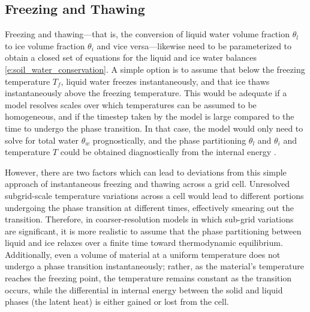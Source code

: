 \documentclass[twoside,10pt]{report}
\begin{document}
\subsection{Freezing and Thawing}
Freezing and thawing---that is, the conversion of liquid water volume fraction $\theta_l$ to ice volume fraction $\theta_i$ and vice versa---likewise need to be parameterized to obtain a closed set of equations for the liquid and ice water balances \eqref{e:soil_water_conservation}. A simple option is to assume that below the freezing temperature $T_f$, liquid water freezes instantaneously, and that ice thaws instantaneously above the freezing temperature. This would be adequate if a model resolves scales over which temperatures can be assumed to be homogeneous, and if the timestep taken by the model is large compared to the time to undergo the phase transition. In that case, the model would only need to solve for total water $\theta_w$ prognostically, and the phase partitioning $\theta_l$ and $\theta_i$ and temperature $T$ could be obtained diagnostically from the internal energy \citep{Longo19a}. 

However, there are two factors which can lead to deviations from this simple approach of instantaneous freezing and thawing across a grid cell. Unresolved subgrid-scale temperature variations across a cell would lead to different portions undergoing the phase transition at different times, effectively smearing out the transition. Therefore, in coarser-resolution models in which sub-grid variations are significant, it is more realistic to assume that the phase partitioning between liquid and ice relaxes over a finite time toward thermodynamic equilibrium. Additionally, even a volume of material at a uniform temperature does not undergo a phase transition instantaneously; rather, as the material's temperature reaches the freezing point, the temperature remains constant as the transition occurs, while the differential in internal energy between the solid and liquid phases (the latent heat) is either gained or lost from the cell.
\end{document}
